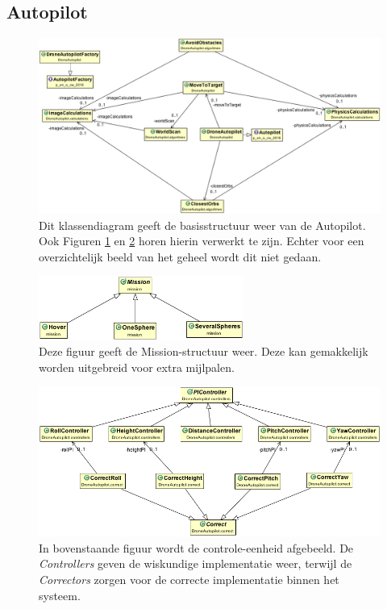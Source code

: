 \subsection{Autopilot}
	\begin{figure}[H]
		\centering
		\includegraphics[width=1\textwidth]{AutopilotDiagram.png}
		\caption{Dit klassendiagram geeft de basisstructuur weer van de Autopilot. Ook Figuren \ref{fig: mission} en \ref{fig: control} horen hierin verwerkt te zijn. Echter voor een overzichtelijk beeld van het geheel wordt dit niet gedaan.}
	\end{figure}
	\begin{figure}[H]
		\centering
		\includegraphics[width=0.6\textwidth]{MissionDiagram.png}
		\caption{Deze figuur geeft de Mission-structuur weer. Deze kan gemakkelijk worden uitgebreid voor extra mijlpalen.}
		\label{fig: mission}
	\end{figure}
	\begin{figure}[H]
		\centering
		\includegraphics[width=1\textwidth]{ControlDiagram.png}
		\caption{In bovenstaande figuur wordt de controle-eenheid afgebeeld. De \textit{Controllers} geven de wiskundige implementatie weer, terwijl de \textit{Correctors} zorgen voor de correcte implementatie binnen het systeem.}
		\label{fig: control}
	\end{figure}
